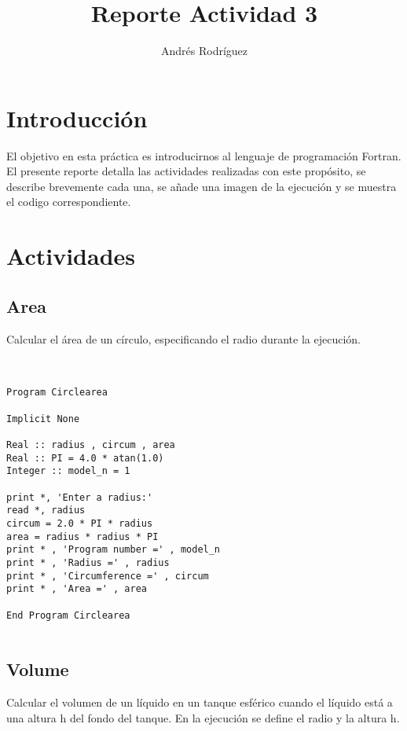 \documentclass{article}
\title{Reporte Actividad 3}
\author{Andr\'es Rodr\'iguez}
\date{}
\begin{document}
\maketitle

\graphicspath{ {Imagenes/} }


\section*{Introducci\'on}

El objetivo en esta pr\'actica es introducirnos al lenguaje de programaci\'on Fortran. El presente reporte detalla las actividades realizadas con este prop\'osito, se describe brevemente cada una, se a\~nade una imagen de la ejecuci\'on y se muestra el codigo correspondiente.
\section*{Actividades}

\subsection*{Area}
Calcular el \'area de un c\'irculo, especificando el radio durante la ejecuci\'on.\\ \\
	
\begin{Verbatim}[frame=single]

Program Circlearea

Implicit None

Real :: radius , circum , area
Real :: PI = 4.0 * atan(1.0) 
Integer :: model_n = 1 

print *, 'Enter a radius:'
read *, radius 
circum = 2.0 * PI * radius
area = radius * radius * PI
print * , 'Program number =' , model_n
print * , 'Radius =' , radius
print * , 'Circumference =' , circum
print * , 'Area =' , area

End Program Circlearea


\end{Verbatim}

\subsection*{Volume}
Calcular el volumen de un l\'iquido en un tanque esf\'erico cuando el l\'iquido est\'a a una altura h del fondo del tanque. En la ejecuci\'on se define el radio y la altura h.\\ \\
\end{document}
